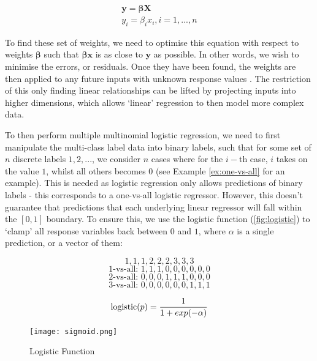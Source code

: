 \begin{equation}
\begin{split}
    \mathbf{y} = \mathbf{\beta X} \\
    y_i = \beta_i x_i,         i = 1,...,n
\end{split}
\end{equation}

To find these set of weights, we need to optimise this equation with respect to weights $\mathbf{\beta}$ such that $\mathbf{\beta x}$ is as close to $\mathbf{y}$ as possible. In other words, we wish to minimise the errors, or residuals. Once they have been found, the weights are then applied to any future inputs with unknown response values . The restriction of this only finding linear relationships can be lifted by projecting inputs into higher dimensions, which allows `linear' regression to then model more complex data.

To then perform multiple multinomial logistic regression, we need to first manipulate the multi-class label data into binary labels, such that for some set of $n$ discrete labels $1, 2,...$, we consider $n$ cases where for the $i-$th case, $i$ takes on the value $1$, whilst all others becomes $0$ (see Example \autoref{ex:one-vs-all} for an example). This is needed as logistic regression only allows predictions of binary labels - this corresponds to a one-vs-all logistic regressor. However, this doesn't guarantee that predictions that each underlying linear regressor will fall within the $[0, 1]$ boundary. To ensure this, we use the logistic function (\autoref{fig:logistic}) to `clamp' all response variables back between $0$ and $1$, where $\alpha$ is a single prediction, or a vector of them:

\begin{ex} \label{ex:one-vs-all}
    $$1, 1, 1, 2, 2, 2, 3, 3, 3$$
    $$1\text{-vs-all: }1, 1, 1, 0, 0, 0, 0, 0, 0$$ 
    $$2\text{-vs-all: }0, 0, 0, 1, 1, 1, 0, 0, 0$$ 
    $$3\text{-vs-all: }0, 0, 0, 0, 0, 0, 1, 1, 1$$
\end{ex}

\begin{equation} \label{eq:logistic}
    \operatorname{logistic}(p) = \frac{1}{1+exp(-\alpha)}
\end{equation}

\begin{figure}
    \texttt{[image: sigmoid.png]}
    \caption{Logistic Function}
    \label{fig:logistic}
\end{figure}

